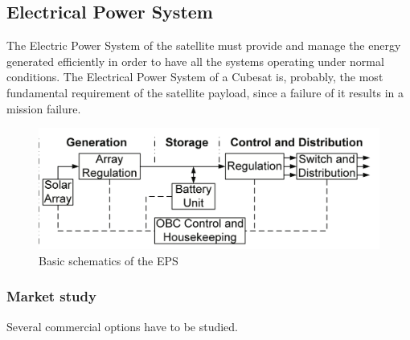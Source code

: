 \subsection{Electrical Power System}

The Electric Power System of the satellite must provide and manage the energy generated efficiently in order to have all the systems operating under normal conditions. The Electrical Power System of a Cubesat is, probably, the most fundamental requirement of the satellite payload, since a failure of it results in a mission failure.

\begin{figure}[h]
\includegraphics[scale=0.6]{./sections/SatelliteDesign/images/EPSschematics}
\centering
\caption{Basic schematics of the EPS \cite{epsbasics}}
\end{figure}

\subsubsection{Market study}
Several commercial options have to be studied.


